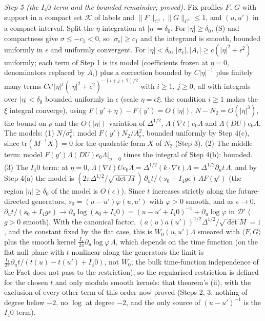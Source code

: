 \emph{Step 5 (the $I_{4}0$ term and the bounded remainder; proved).} Fix profiles $F$, $G$ with support in a compact set $\mathcal{K}$ of labels and $\|F\|_{C^{1}}, \|G\|_{C^{1}} \le 1$, and $(u, u')$ in a compact interval. Split the $\eta$ integration at $|\eta| = \delta_{0}$. For $|\eta| \ge \delta_{0}$, (S) and compactness give $\sigma \le -c_{1} < 0$, so $|\sigma_{\epsilon}| \ge c_{1}$ and the integrand is smooth, bounded uniformly in $\epsilon$ and uniformly convergent. For $|\eta| < \delta_{0}$, $|\sigma_{\epsilon}|, |A_{\epsilon}| \ge c(|\eta|^{2} + \epsilon^{2})$ uniformly; each term of Step 1 is its model (coefficients frozen at $\eta = 0$, denominators replaced by $A_{\epsilon}$) plus a correction bounded by $C|\eta|^{-1}$ plus finitely many terms $C\epsilon^{i}|\eta|^{j}(|\eta|^{2} + \epsilon^{2})^{-(i + j + 2)/2}$ with $i \ge 1$, $j \ge 0$, all with integrals over $|\eta| < \delta_{0}$ bounded uniformly in $\epsilon$ (scale $\eta = \epsilon\xi$; the condition $i \ge 1$ makes the $\xi$ integral converge), using $F(y' + \eta) - F(y') = O(|\eta|)$, $N - N_{2} = O(|\eta|^{3})$, the bound on $\rho$ and the $O(|\eta|)$ variation of $\Delta^{1/2}$, $\Lambda(\nabla t)e_{0}\Lambda$ and $\Lambda(DU)e_{0}\Lambda$. The models:
(1) $N/\sigma_{\epsilon}^{2}$: model $F(y')N_{2}/A_{\epsilon}^{2}$, bounded uniformly by Step 4(c), since $\mathrm{tr}(M^{-1}X) = 0$ for the quadratic form $X$ of $N_{2}$ (Step 3).
(2) The middle term: model $F(y')\Lambda(DU)e_{0}\Lambda|_{\eta = 0}$ times the integral of Step 4(b): bounded.
(3) The $I_{4}0$ term: at $\eta = 0$, $\Lambda(\nabla t)Ue_{0}\Lambda = \Delta^{1/2}(k\cdot\nabla t)\Lambda = \Delta^{1/2}\partial_{u}t\,\Lambda$, and by Step 4(a) the model is $(2\pi\Delta^{1/2}/\sqrt{\det M})\,\partial_{u}t/(s_{0} + I_{4}g\epsilon)\,\Lambda F(y')$ (the region $|\eta| \ge \delta_{0}$ of the model is $O(\epsilon)$). Since $t$ increases strictly along the future-directed generators, $s_{0} = (u - u')\varphi(u, u')$ with $\varphi > 0$ smooth, and as $\epsilon \to 0$, $\partial_{u}t/(s_{0} + I_{4}g\epsilon) \to \partial_{u}\log(s_{0} + I_{4}0) = (u - u' + I_{4}0)^{-1} + \partial_{u}\log\varphi$ in $\mathcal{D}'$ ($g > 0$ smooth). With the canonical factor, $(a(u)a(u'))^{1/2}\Delta^{1/2}/\sqrt{\det M} = 1$, and the constant fixed by the flat case, this is $W_{0}(u, u')\Lambda$ smeared with $\langle F, G\rangle$ plus the smooth kernel $\tfrac{I_{4}}{2\pi}\partial_{u}\log\varphi\,\Lambda$, which depends on the time function (on the flat null plane with $t$ nonlinear along the generators the limit is $\tfrac{I_{4}}{2\pi}\partial_{u}t/(t(u) - t(u') + I_{4}0)$, not $W_{0}$; the bulk time-function independence of the Fact does not pass to the restriction), so the regularised restriction is defined for the chosen $t$ and only modulo smooth kernels: that theorem's (ii), with the exclusion of every other term of this order now proved (Steps 2, 3: nothing of degree below $-2$, no $\log$ at degree $-2$, and the only source of $(u - u')^{-1}$ is the $I_{4}0$ term).

